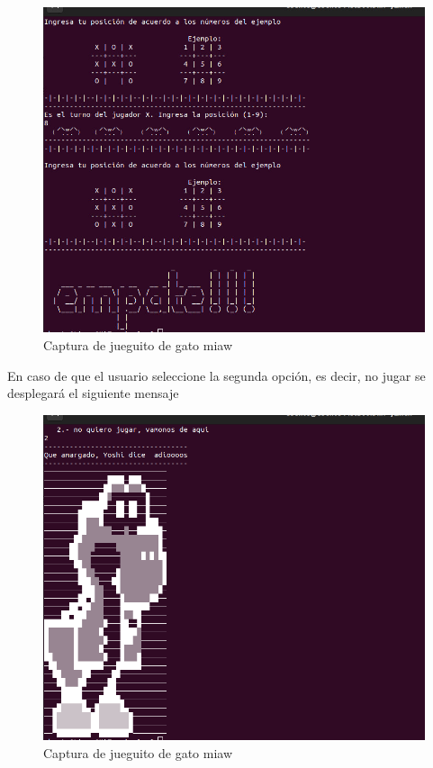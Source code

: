 \documentclass[12pt,a4paper]{article}
\begin{document}
\begin{figure}[H]
    \centering
    \includegraphics[width=\textwidth]{img/4.jpeg}
    \caption{Captura de jueguito de gato miaw}
    \label{gato3}
\end{figure}

\noindent En caso de que el usuario seleccione la segunda opción, es decir, no jugar se desplegará el siguiente mensaje

\begin{figure}[H]
    \centering
    \includegraphics[width=\textwidth]{img/5.png}
    \caption{Captura de jueguito de gato miaw}
    \label{gato4}
\end{figure}
\newpage
\end{document}
